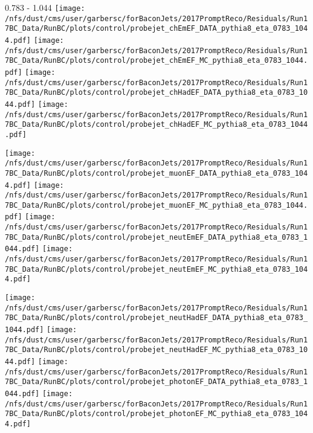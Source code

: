\documentclass[t,compress]{beamer}
\begin{document}
\begin{frame}{0.783 - 1.044}
	\texttt{[image: /nfs/dust/cms/user/garbersc/forBaconJets/2017PromptReco/Residuals/Run17BC\_Data/RunBC/plots/control/probejet\_chEmEF\_DATA\_pythia8\_eta\_0783\_1044.pdf]}
	\texttt{[image: /nfs/dust/cms/user/garbersc/forBaconJets/2017PromptReco/Residuals/Run17BC\_Data/RunBC/plots/control/probejet\_chEmEF\_MC\_pythia8\_eta\_0783\_1044.pdf]}
	\texttt{[image: /nfs/dust/cms/user/garbersc/forBaconJets/2017PromptReco/Residuals/Run17BC\_Data/RunBC/plots/control/probejet\_chHadEF\_DATA\_pythia8\_eta\_0783\_1044.pdf]}
	\texttt{[image: /nfs/dust/cms/user/garbersc/forBaconJets/2017PromptReco/Residuals/Run17BC\_Data/RunBC/plots/control/probejet\_chHadEF\_MC\_pythia8\_eta\_0783\_1044.pdf]}
\newline

\vspace{-0.65cm}
	\texttt{[image: /nfs/dust/cms/user/garbersc/forBaconJets/2017PromptReco/Residuals/Run17BC\_Data/RunBC/plots/control/probejet\_muonEF\_DATA\_pythia8\_eta\_0783\_1044.pdf]}
	\texttt{[image: /nfs/dust/cms/user/garbersc/forBaconJets/2017PromptReco/Residuals/Run17BC\_Data/RunBC/plots/control/probejet\_muonEF\_MC\_pythia8\_eta\_0783\_1044.pdf]}
	\texttt{[image: /nfs/dust/cms/user/garbersc/forBaconJets/2017PromptReco/Residuals/Run17BC\_Data/RunBC/plots/control/probejet\_neutEmEF\_DATA\_pythia8\_eta\_0783\_1044.pdf]}
	\texttt{[image: /nfs/dust/cms/user/garbersc/forBaconJets/2017PromptReco/Residuals/Run17BC\_Data/RunBC/plots/control/probejet\_neutEmEF\_MC\_pythia8\_eta\_0783\_1044.pdf]}
\newline

\vspace{-0.65cm}
	\texttt{[image: /nfs/dust/cms/user/garbersc/forBaconJets/2017PromptReco/Residuals/Run17BC\_Data/RunBC/plots/control/probejet\_neutHadEF\_DATA\_pythia8\_eta\_0783\_1044.pdf]}
	\texttt{[image: /nfs/dust/cms/user/garbersc/forBaconJets/2017PromptReco/Residuals/Run17BC\_Data/RunBC/plots/control/probejet\_neutHadEF\_MC\_pythia8\_eta\_0783\_1044.pdf]}
	\texttt{[image: /nfs/dust/cms/user/garbersc/forBaconJets/2017PromptReco/Residuals/Run17BC\_Data/RunBC/plots/control/probejet\_photonEF\_DATA\_pythia8\_eta\_0783\_1044.pdf]}
	\texttt{[image: /nfs/dust/cms/user/garbersc/forBaconJets/2017PromptReco/Residuals/Run17BC\_Data/RunBC/plots/control/probejet\_photonEF\_MC\_pythia8\_eta\_0783\_1044.pdf]}
\end{frame}
\end{document}
